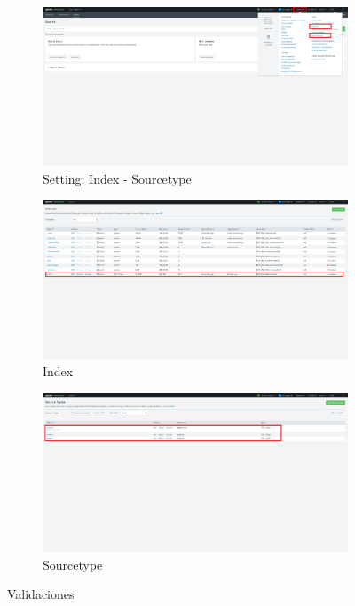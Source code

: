 \documentclass[report]{article}
\begin{document}
\begin{figure}[h!]
  \centering
  \begin{subfigure}[b]{0.49\linewidth}
    \includegraphics[width=\linewidth]{img/f.png}
     \caption{\color{text} Setting: Index - Sourcetype}
  \end{subfigure}
  \begin{subfigure}[b]{0.49\linewidth}
    \includegraphics[width=\linewidth]{img/d.png}
    \caption{\color{text} Index}
  \end{subfigure}
  \begin{subfigure}[b]{0.49\linewidth}
    \includegraphics[width=\linewidth]{img/e.png}
    \caption{\color{text} Sourcetype}
  \end{subfigure}
  \caption{\color{text} Validaciones}
  \label{fig:validacion}
\end{figure}
\end{document}
